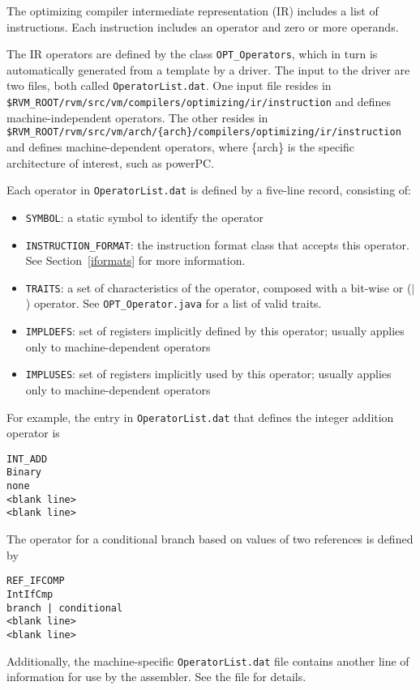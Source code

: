 The optimizing compiler intermediate representation (IR) includes a list
of instructions.  Each instruction includes an operator and zero or
more operands.

The IR operators are defined by the class {\tt OPT\_Operators}, which in
turn is automatically generated from a template by a driver.  The input to the
driver are two files, both called {\tt OperatorList.dat}.  One input
file resides in {\tt \$RVM\_ROOT/rvm/src/vm/compilers/optimizing/ir/instruction} and defines machine-independent
operators.  The other resides in {\tt \$RVM\_ROOT/rvm/src/vm/arch/\{arch\}/compilers/optimizing/ir/instruction}
and defines machine-dependent operators, where \{arch\} is the
specific architecture of interest, such as powerPC.

Each operator in {\tt OperatorList.dat} is defined by a five-line record,
consisting of:
\begin{itemize}
\item {\tt SYMBOL}: a static symbol to identify the operator
\item {\tt INSTRUCTION\_FORMAT}: the instruction format class that accepts this operator.  See Section~\ref{iformats} for more information.
\item {\tt TRAITS}: a set of characteristics of the operator, composed with a bit-wise or ($|$) operator.  See {\tt OPT\_Operator.java} for a list of valid traits.
\item {\tt IMPLDEFS}: set of registers implicitly defined by this operator; usually applies only to machine-dependent operators
\item {\tt IMPLUSES}: set of registers implicitly used by this operator; usually applies only to machine-dependent operators
\end{itemize}

For example, the entry in {\tt OperatorList.dat} that defines the integer
addition operator is
\begin{verbatim}
INT_ADD
Binary
none
<blank line>
<blank line>
\end{verbatim}

The operator for a conditional branch based on values of two references is
defined by
\begin{verbatim}
REF_IFCOMP
IntIfCmp
branch | conditional
<blank line>
<blank line>
\end{verbatim}

Additionally,  the machine-specific {\tt OperatorList.dat} file contains 
another line of information for use by the assembler.  See the file for details.


